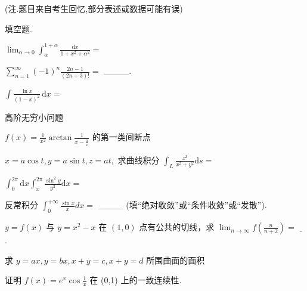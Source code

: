 (注.题目来自考生回忆,部分表述或数据可能有误)\par
\par{}
填空题.\par
$\lim_{\alpha \to 0}\int_{\alpha}^{1 + \alpha}\frac{\mathrm{d}x}{1 + x^2 + \alpha^2} =$\par
$\sum_{n=1}^{\infty} (-1)^{n} \frac{2n - 1}{(2n + 3)!} =$ \_\_\_\_.\par
$\int \frac{\ln x}{(1 - x)^2} \, \mathrm{d}x =$\par
高阶无穷小问题\par
$f(x) = \frac{1}{x^2}\arctan \frac{1}{x - \frac{1}{x}}$ 的第一类间断点\par
$x = a\cos t, y = a\sin t, z = at,$ 求曲线积分 $\int_{L}\frac{z^{2}}{x^{2} + y^{2}}\mathrm{d}s =$\par
$\int_0^{2\pi}\mathrm{d}x\int_x^{2\pi}\frac{\sin^2y}{y^2}\mathrm{d}x =$\par
反常积分  $\int_{0}^{+\infty}\frac{\sin x}{x}dx=$  \_\_\_\_ (填“绝对收敛”或“条件收敛”或“发散”).\par
$y = f(x)$ 与 $y = x^{2} - x$ 在 $(1,0)$ 点有公共的切线，求 $\lim_{n\to \infty}f\left(\frac{n}{n + 2}\right) = \underline{\quad}$.\par
求 $y = ax, y = bx, x + y = c, x + y = d$ 所围曲面的面积\par
\par{}
证明 $f(x) = e^{x} \cos \frac{1}{x}$ 在 (0,1) 上的一致连续性.\par
